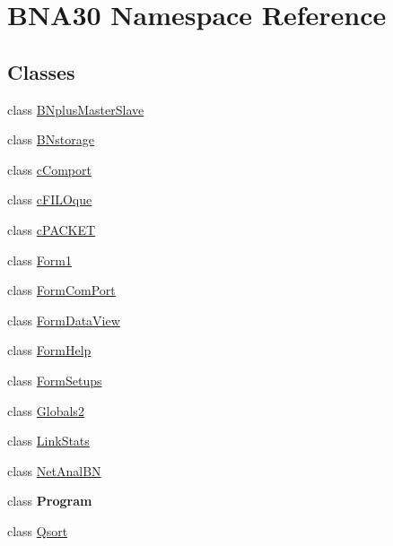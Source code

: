 \hypertarget{namespace_b_n_a30}{}\section{B\+N\+A30 Namespace Reference}
\label{namespace_b_n_a30}
\subsection*{Classes}
\begin{DoxyCompactItemize}
\item 
class \mbox{\hyperlink{class_b_n_a30_1_1_b_nplus_master_slave}{B\+Nplus\+Master\+Slave}}
\item 
class \mbox{\hyperlink{class_b_n_a30_1_1_b_nstorage}{B\+Nstorage}}
\item 
class \mbox{\hyperlink{class_b_n_a30_1_1c_comport}{c\+Comport}}
\item 
class \mbox{\hyperlink{class_b_n_a30_1_1c_f_i_l_oque}{c\+F\+I\+L\+Oque}}
\item 
class \mbox{\hyperlink{class_b_n_a30_1_1c_p_a_c_k_e_t}{c\+P\+A\+C\+K\+ET}}
\item 
class \mbox{\hyperlink{class_b_n_a30_1_1_form1}{Form1}}
\item 
class \mbox{\hyperlink{class_b_n_a30_1_1_form_com_port}{Form\+Com\+Port}}
\item 
class \mbox{\hyperlink{class_b_n_a30_1_1_form_data_view}{Form\+Data\+View}}
\item 
class \mbox{\hyperlink{class_b_n_a30_1_1_form_help}{Form\+Help}}
\item 
class \mbox{\hyperlink{class_b_n_a30_1_1_form_setups}{Form\+Setups}}
\item 
class \mbox{\hyperlink{class_b_n_a30_1_1_globals2}{Globals2}}
\item 
class \mbox{\hyperlink{class_b_n_a30_1_1_link_stats}{Link\+Stats}}
\item 
class \mbox{\hyperlink{class_b_n_a30_1_1_net_anal_b_n}{Net\+Anal\+BN}}
\item 
class {\bfseries Program}
\item 
class \mbox{\hyperlink{class_b_n_a30_1_1_qsort}{Qsort}}
\end{DoxyCompactItemize}

